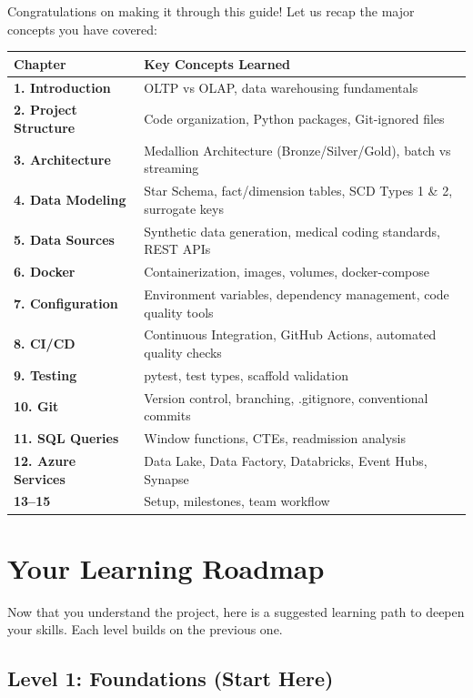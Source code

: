 \documentclass[12pt, a4paper, oneside]{report}
\begin{document}
Congratulations on making it through this guide! Let us recap the major concepts you have covered:

\begin{center}
\begin{tabular}{>{\bfseries}p{4cm} p{9cm}}
    \toprule
    \textbf{Chapter} & \textbf{Key Concepts Learned} \\
    \midrule
    1. Introduction & OLTP vs OLAP, data warehousing fundamentals \\
    2. Project Structure & Code organization, Python packages, Git-ignored files \\
    3. Architecture & Medallion Architecture (Bronze/Silver/Gold), batch vs streaming \\
    4. Data Modeling & Star Schema, fact/dimension tables, SCD Types 1 \& 2, surrogate keys \\
    5. Data Sources & Synthetic data generation, medical coding standards, REST APIs \\
    6. Docker & Containerization, images, volumes, docker-compose \\
    7. Configuration & Environment variables, dependency management, code quality tools \\
    8. CI/CD & Continuous Integration, GitHub Actions, automated quality checks \\
    9. Testing & pytest, test types, scaffold validation \\
    10. Git & Version control, branching, .gitignore, conventional commits \\
    11. SQL Queries & Window functions, CTEs, readmission analysis \\
    12. Azure Services & Data Lake, Data Factory, Databricks, Event Hubs, Synapse \\
    13--15 & Setup, milestones, team workflow \\
    \bottomrule
\end{tabular}
\end{center}

\section{Your Learning Roadmap}

Now that you understand the project, here is a suggested learning path to deepen your skills. Each level builds on the previous one.

\subsection{Level 1: Foundations (Start Here)}
\end{document}
